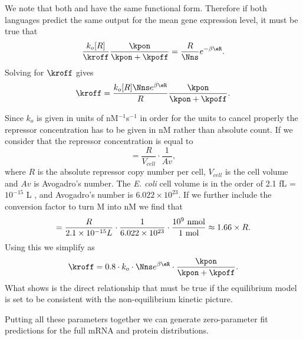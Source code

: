 We note that both  and  have the same
functional form. Therefore if both languages predict the same output for the
mean gene expression level, it must be true that
\begin{equation}
  {k_o [R] \over \kroff}{\kpon \over \kpon + \kpoff} =
  {R \over \Nns} e^{-\beta\eR}.
\end{equation}
Solving for $\kroff$ gives
\begin{equation}
  \kroff = {k_o [R] \Nns e^{\beta\eR} \over R}{\kpon \over \kpon + \kpoff}.
  \label{seq_kroff_complete}
\end{equation}

Since $k_o$ is given in units of nM$^{-1}$s$^{-1}$ in order for the units to
cancel properly the repressor concentration has to be given in nM rather than
absolute count. If we consider that the repressor concentration is equal to
\begin{equation}
[R] = \frac{R}{V_{cell}}\cdot \frac{1}{Av},
\end{equation}
where $R$ is the absolute repressor copy number per cell, $V_{cell}$ is the cell
volume and $Av$ is Avogadro's number. The \textit{E. coli} cell volume is in the
order of 2.1 fL = $10^{-15}$ L , and Avogadro's
number is $6.022 \times 10^{23}$. If we further include the conversion factor to
turn M into nM we find that
\begin{equation}
[R] = {R \over 2.1 \times 10^{-15} L} \cdot {1 \over 6.022 \times 10^{23}}
\cdot {10^9 \text{ nmol} \over 1 \text{ mol}} \approx 1.66 \times R.
\end{equation}
Using this we simplify  as
\begin{equation}
  \kroff = 0.8 \cdot k_o \cdot \Nns e^{\beta\eR}
   \cdot {\kpon \over \kpon + \kpoff}.
  \label{seq_kroff}
\end{equation}
What  shows is the direct relationship that must be true if the
equilibrium model is set to be consistent with the non-equilibrium kinetic
picture.



Putting all these parameters together we can generate zero-parameter fit
predictions for the full mRNA and protein distributions.
